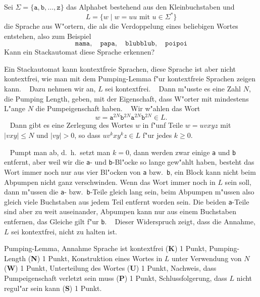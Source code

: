 Sei $\Sigma=\{\texttt{a},\texttt{b},\dots,\texttt{z}\}$ das Alphabet
bestehend aus den Kleinbuchstaben und 
\[
L=\{ w\;|\; \text{$w=uu$ mit $u\in\Sigma^*$}\}
\]
die Sprache aus W"ortern, die als die Verdoppelung eines beliebigen
Wortes entstehen, also zum Beispiel
\[
\texttt{mama},\quad
\texttt{papa},\quad
\texttt{blubblub},\quad
\texttt{poipoi}
\]
Kann ein Stackautomat diese Sprache erkennen?





\begin{loesung}
Ein Stackautomat kann kontextfreie Sprachen, diese Sprache ist aber nicht
kontextfrei, wie man mit dem Pumping-Lemma f"ur kontextfreie
Sprachen zeigen kann.
~%
Dazu nehmen wir an, $L$ sei kontextfrei.
~%
Dann m"usste es eine Zahl $N$, die Pumping Length, geben, mit der Eigenschaft,
dass W"orter mit mindestens L"ange $N$ die Pumpeigenschaft haben.
~%
Wir w"ahlen das Wort
\[
w=
\texttt{a}^{2N}
\texttt{b}^{2N}
\texttt{a}^{2N}
\texttt{b}^{2N}
\in L.
\]
~%
Dann gibt es eine Zerlegung des Wortes $w$ in f"unf Teile $w=uvxyz$ mit
$|vxy|\le N$ und $|vy|>0$, so dass $uv^kxy^kz\in L$ f"ur jedes $k\ge 0$.

~%
Pumpt man ab, d.~h.~setzt man $k=0$, dann werden zwar einige \texttt{a}
und \texttt{b} entfernt, aber weil wir die \texttt{a}- und \texttt{b}-Bl"ocke
so lange gew"ahlt haben, besteht das Wort immer noch nur aus
vier Bl"ocken von \texttt{a} bzw.~\texttt{b}, ein Block kann nicht beim
Abpumpen nicht ganz verschwinden.
Wenn das Wort immer noch in $L$ sein soll, dann m"ussen die \texttt{a}-
bzw.~\texttt{b}-Teile gleich lang sein, beim Abpumpen m"ussen also
gleich viele Buchstaben aus jedem Teil entfernt worden sein.
Die beiden \texttt{a}-Teile sind aber zu weit auseinander, Abpumpen
kann nur aus einem Buchstaben entfernen, das Gleiche gilt f"ur \texttt{b}.
~%
Dieser Widerspruch zeigt, dass die Annahme, $L$ sei kontextfrei, nicht
zu halten ist.
\end{loesung}

\begin{bewertung}
Pumping-Lemma, Annahme Sprache ist kontextfrei ({\bf K}) 1 Punkt,
Pumping-Length ({\bf N}) 1 Punkt,
Konstruktion eines Wortes in $L$ unter Verwendung von $N$ ({\bf W}) 1 Punkt,
Unterteilung des Wortes ({\bf U}) 1 Punkt,
Nachweis, dass Pumpeigenschaft verletzt sein muss ({\bf P}) 1 Punkt,
Schlussfolgerung, dass $L$ nicht regul"ar sein kann ({\bf S}) 1 Punkt.
\end{bewertung}




